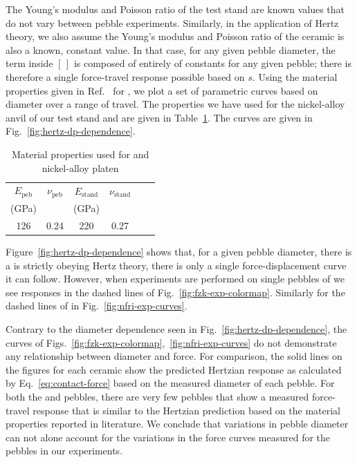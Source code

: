 The Young's modulus and Poisson ratio of the test stand are known values that do not vary between pebble experiments. Similarly, in the application of Hertz theory, we also assume the Young's modulus and Poisson ratio of the ceramic is also a known, constant value. In that case, for any given pebble diameter, the term inside $[\,]$ is composed of entirely of constants for any given pebble; there is therefore a single force-travel response possible based on $s$. Using the material properties given in Ref.~\cite{Gierszewski1998} for \lit, we plot a set of parametric curves based on diameter over a range of travel. The properties we have used for the nickel-alloy anvil of our test stand and \lit are given in Table~\ref{tab:hertz-dp-study-props}. The curves are given in Fig.~\ref{fig:hertz-dp-dependence}.

\begin {table}[htp] %
\caption{Material properties used for \lit and nickel-alloy platen}
\label {tab:hertz-dp-study-props} \centering %
\begin {tabular}{ cccccc }
\toprule %
$E_\text{peb}$      &     $\nu_\text{peb}$  &   $E_\text{stand}$        &     $\nu_\text{stand}$    \\
(GPa)           &                   &   (GPa)               &                   \\\toprule
126             &   0.24                &   220                 &   0.27                \\\bottomrule
\end{tabular}
\end{table}

Figure~\ref{fig:hertz-dp-dependence} shows that, for a given pebble diameter, there is a  is strictly obeying Hertz theory, there is only a single force-displacement curve it can follow. However, when experiments are performed on single pebbles of \lis we see responses in the dashed lines of Fig.~\ref{fig:fzk-exp-colormap}. Similarly for the dashed lines of \lit in Fig.~\ref{fig:nfri-exp-curves}.

Contrary to the diameter dependence seen in Fig.~\ref{fig:hertz-dp-dependence}, the curves of Figs.~\ref{fig:fzk-exp-colormap},~\ref{fig:nfri-exp-curves} do not demonstrate any relationship between diameter and force. For comparison, the solid lines on the figures for each ceramic show the predicted Hertzian response as calculated by Eq.~\ref{eq:contact-force} based on the measured diameter of each pebble. For both the \lis and \lit pebbles, there are very few pebbles that show a measured force-travel response that is similar to the Hertzian prediction based on the material properties reported in literature. We conclude that variations in pebble diameter can not alone account for the variations in the force curves measured for the pebbles in our experiments. %

